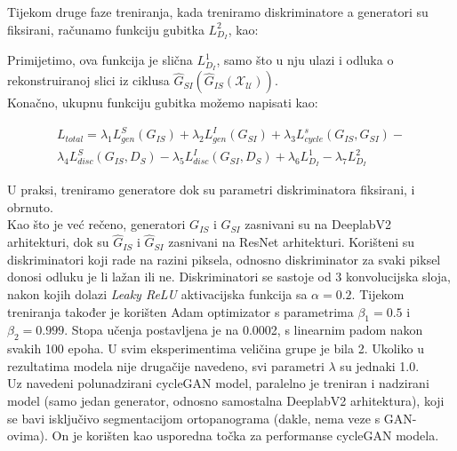 Tijekom druge faze treniranja, kada treniramo diskriminatore a generatori su fiksirani, računamo funkciju gubitka $L_{D_{I}}^2$, kao:

\begin{myequation}%
\end{myequation}

\noindent Primijetimo, ova funkcija je slična $L_{D_{I}}^1$, samo što u nju ulazi i odluka o rekonstruiranoj slici iz ciklusa  $\hat{G}_{SI}(\hat{G}_{IS}(\mathcal{X_{U}}))$.\\

\noindent Konačno, ukupnu funkciju gubitka možemo napisati kao:

\begin{multline*}
L_{total} = \lambda_{1}L^{S}_{gen}(G_{IS}) + \lambda_{2}L^{I}_{gen}(G_{SI}) + \lambda_{3}L_{cycle}^s(G_{IS}, G_{SI}) -\\ \lambda_{4}L^{S}_{disc}(G_{IS},D_{S}) - \lambda_{5}L^{I}_{disc}(G_{SI},D_{S}) + \lambda_{6}L_{D_{I}}^1 - \lambda_{7}L_{D_{I}}^2
\end{multline*}

\noindent U praksi, treniramo generatore dok su parametri diskriminatora fiksirani, i obrnuto. \\

\noindent Kao što je već rečeno, generatori $G_{IS}$ i $G_{SI}$ zasnivani su na DeeplabV2 arhitekturi, dok su $\hat{G}_{IS}$ i $\hat{G}_{SI}$ zasnivani na ResNet arhitekturi. Korišteni su diskriminatori koji rade na razini piksela, odnosno diskriminator za svaki piksel donosi odluku je li lažan ili ne. Diskriminatori se sastoje od 3 konvolucijska sloja, nakon kojih dolazi \textit{Leaky ReLU} aktivacijska funkcija sa $\alpha = 0.2$.
\noindent Tijekom treniranja također je korišten Adam optimizator s parametrima $\beta_{1} = 0.5$ i $\beta_{2} = 0.999$. Stopa učenja postavljena je na 0.0002, s linearnim padom nakon svakih 100 epoha. U svim eksperimentima veličina grupe  je bila 2. Ukoliko u rezultatima modela nije drugačije navedeno, svi parametri $\lambda$ su jednaki 1.0.\\

\noindent Uz navedeni polunadzirani cycleGAN model, paralelno je treniran i nadzirani model (samo jedan generator, odnosno samostalna DeeplabV2 arhitektura), koji se bavi isključivo segmentacijom ortopanograma (dakle, nema veze s GAN-ovima). On je korišten kao usporedna točka za performanse cycleGAN modela.
